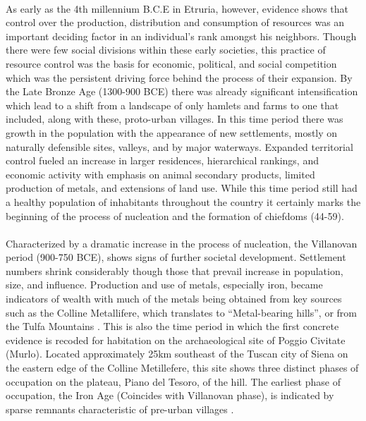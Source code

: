 \documentclass[12pt,a4paper]{thesis}
\begin{document}
\paragraph{}
As early as the 4th millennium B.C.E in Etruria, however, evidence shows that control over the production, distribution and consumption of resources was an important deciding factor in an individual's rank amongst his neighbors. Though there were few social divisions within these early societies, this practice of resource control was the basis for economic, political, and social competition which was the persistent driving force behind the process of their expansion. By the Late Bronze Age (1300-900 BCE) there was already significant intensification which lead to a shift from a landscape of only hamlets and farms to one that included, along with these, proto-urban villages. In this time period there was growth in the population with the appearance of new settlements, mostly on naturally defensible sites, valleys, and by major waterways. Expanded  territorial control fueled an increase in larger residences, hierarchical rankings, and economic activity with emphasis on animal secondary products, limited production of metals, and extensions of land use. While this time period still had a healthy population of inhabitants throughout the country it certainly marks the beginning of the process of nucleation and the formation of chiefdoms (44-59).

\paragraph{}  
Characterized by a dramatic increase in the process of nucleation, the Villanovan period (900-750 BCE), shows signs of further societal development.  Settlement numbers shrink considerably though those that prevail increase in population, size, and influence. Production and use of metals, especially iron, became indicators of wealth with much of the metals being obtained from key sources such as the Colline Metallifere, which translates to ``Metal-bearing hills'', or from the Tulfa Mountains \cite[75-77]{SpiSto92}. This is also the time period in which the first concrete evidence is recoded for habitation on the archaeological site of Poggio Civitate (Murlo). Located approximately 25km southeast of the Tuscan city of Siena on the eastern edge of the Colline Metillefere, this site shows three distinct phases of occupation on the plateau, Piano del Tesoro, of the hill. The earliest phase of occupation, the Iron Age (Coincides with Villanovan phase), is indicated by sparse remnants characteristic of pre-urban villages \citep{AnnAnd}.
\end{document}
